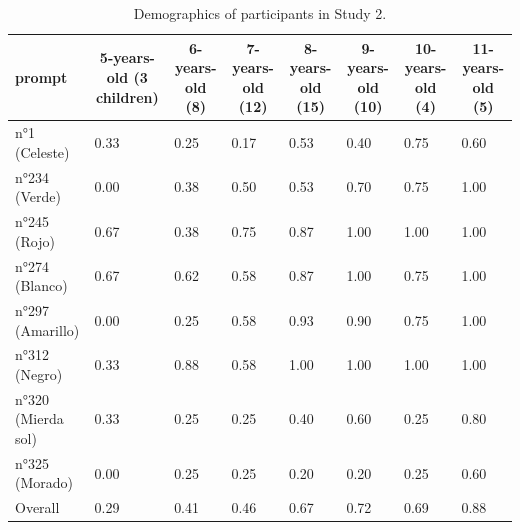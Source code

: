 \documentclass[
  english,
  ,man,floatsintext]{apa6}
\begin{document}
\begin{table}[tbp]

\begin{center}
\begin{threeparttable}

\caption{\label{tab:study2_prodtable}Demographics of participants in Study 2.}

\begin{tabular}{llllllll}
\toprule
prompt & \multicolumn{1}{c}{5-years-old (3 children)} & \multicolumn{1}{c}{6-years-old (8)} & \multicolumn{1}{c}{7-years-old (12)} & \multicolumn{1}{c}{8-years-old (15)} & \multicolumn{1}{c}{9-years-old (10)} & \multicolumn{1}{c}{10-years-old (4)} & \multicolumn{1}{c}{11-years-old (5)}\\
\midrule
n°1 (Celeste) & 0.33 & 0.25 & 0.17 & 0.53 & 0.40 & 0.75 & 0.60\\
n°234 (Verde) & 0.00 & 0.38 & 0.50 & 0.53 & 0.70 & 0.75 & 1.00\\
n°245 (Rojo) & 0.67 & 0.38 & 0.75 & 0.87 & 1.00 & 1.00 & 1.00\\
n°274 (Blanco) & 0.67 & 0.62 & 0.58 & 0.87 & 1.00 & 0.75 & 1.00\\
n°297 (Amarillo) & 0.00 & 0.25 & 0.58 & 0.93 & 0.90 & 0.75 & 1.00\\
n°312 (Negro) & 0.33 & 0.88 & 0.58 & 1.00 & 1.00 & 1.00 & 1.00\\
n°320 (Mierda sol) & 0.33 & 0.25 & 0.25 & 0.40 & 0.60 & 0.25 & 0.80\\
n°325 (Morado) & 0.00 & 0.25 & 0.25 & 0.20 & 0.20 & 0.25 & 0.60\\
Overall & 0.29 & 0.41 & 0.46 & 0.67 & 0.72 & 0.69 & 0.88\\
\bottomrule
\end{tabular}

\end{threeparttable}
\end{center}

\end{table}
\end{document}
